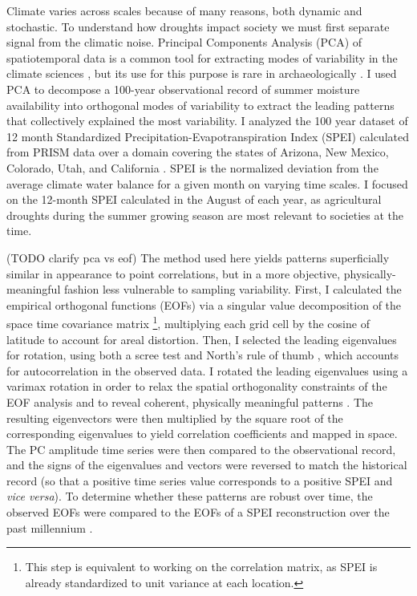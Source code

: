 \documentclass[10pt]{iopart}
\begin{document}
Climate varies across scales because of many reasons, both dynamic and stochastic. To understand how droughts impact society we must first separate signal from the climatic noise. Principal Components Analysis (PCA) of spatiotemporal data is a common tool for extracting modes of variability in the climate sciences \parencite{Lorenz1956,Hannachi2007}, but its use for this purpose is rare in archaeologically \parencite{Weiss1982, Cordell2007}. I used PCA to decompose a 100-year observational record of summer moisture availability into orthogonal modes of variability to extract the leading patterns that collectively explained the most variability. I analyzed the 100 year dataset of 12 month Standardized Precipitation-Evapotranspiration Index (SPEI) calculated from PRISM data over a domain covering the states of Arizona, New Mexico, Colorado, Utah, and California \parencite{Daly1997}. SPEI is the normalized deviation from the average climate water balance for a given month on varying time scales. I focused on the 12-month SPEI calculated in the August of each year, as agricultural droughts during the summer growing season are most relevant to societies at the time.

(TODO clarify pca vs eof) The method used here yields patterns superficially similar in appearance to point correlations, but in a more objective, physically-meaningful fashion less vulnerable to sampling variability. First, I calculated the empirical orthogonal functions (EOFs) via a singular value decomposition of the space time covariance matrix \footnote{This step is equivalent to working on the correlation matrix, as SPEI is already standardized to unit variance at each location.}, multiplying each grid cell by the cosine of latitude to account for areal distortion. Then, I selected the leading eigenvalues for rotation, using both a scree test and North's rule of thumb \parencite{North1982}, which accounts for autocorrelation in the observed data. I rotated the leading eigenvalues using a varimax rotation in order to relax the spatial orthogonality constraints of the EOF analysis and to reveal coherent, physically meaningful patterns \parencite{Richman1986}. The resulting eigenvectors were then multiplied by the square root of the corresponding eigenvalues to yield correlation coefficients and mapped in space. The PC amplitude time series were then compared to the observational record, and the signs of the eigenvalues and vectors were reversed to match the historical record (so that a positive time series value corresponds to a positive SPEI and \textit{vice versa}). To determine whether these patterns are robust over time, the observed EOFs were compared to the EOFs of a SPEI reconstruction over the past millennium \parencite{Steiger2018}.
\end{document}
